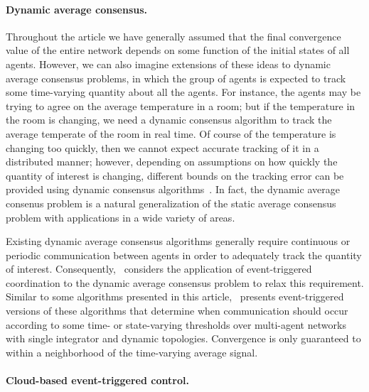 \documentclass{autart}
\begin{document}
{\paragraph*{Dynamic average consensus.} Throughout the article we have
generally assumed that the final convergence value of the entire
network depends on some function of the initial states of all
agents. However, we can also imagine extensions of these ideas to
{dynamic average consensus} problems, in which the group of agents is
expected to track some time-varying quantity about all the agents. For
instance, the agents may be trying to agree on the average temperature
in a room; but if the temperature in the room is changing, we need a
dynamic consensus algorithm to track the average temperate of the room
in real time.  Of course of the temperature is changing too quickly,
then we cannot expect accurate tracking of it in a distributed manner;
however, depending on assumptions on how quickly the quantity of
interest is changing, different bounds on the tracking error can be
provided using dynamic consensus
algorithms~\citep{RAF-PY-KML:06b,DPS-ROS-RMM:05-ifac,SSK-JC-SM:15-ijrnc}. In
fact, the dynamic average consenus problem is a natural generalization
of the static average consensus problem with applications in a wide
variety of areas.
 
Existing dynamic average consensus algorithms generally require
continuous or periodic communication between agents in order to
adequately track the quantity of interest.
Consequently,~\cite{SSK-JC-SM:15} considers the application of
event-triggered coordination to the dynamic average consensus problem
to relax this requirement. Similar to some algorithms presented in
this article,~\cite{SSK-JC-SM:15} presents event-triggered versions of
these algorithms that determine when communication should occur
according to some time- or state-varying thresholds over multi-agent
networks with single integrator and dynamic topologies. Convergence is
only guaranteed to within a neighborhood of the time-varying average
signal.


\paragraph*{Cloud-based event-triggered control.}

}
\end{document}
